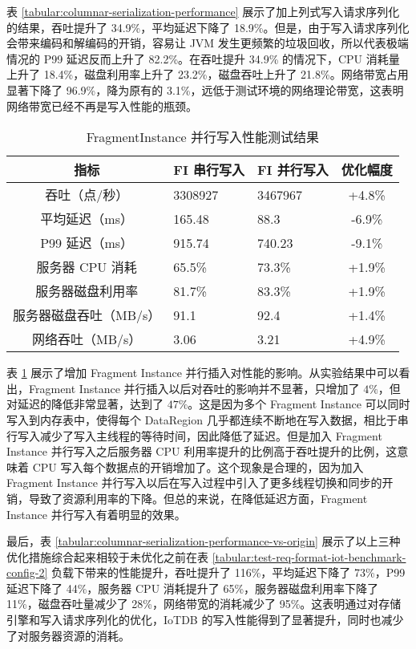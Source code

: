 表 \ref{tabular:columnar-serialization-performance} 展示了加上列式写入请求序列化的结果，吞吐提升了 34.9\%，平均延迟下降了 18.9\%。但是，由于写入请求序列化会带来编码和解编码的开销，容易让 JVM 发生更频繁的垃圾回收，所以代表极端情况的 P99 延迟反而上升了 82.2\%。在吞吐提升 34.9\% 的情况下，CPU 消耗量上升了 18.4\%，磁盘利用率上升了 23.2\%，磁盘吞吐上升了 21.8\%。网络带宽占用显著下降了 96.9\%，降为原有的 3.1\%，远低于测试环境的网络理论带宽，这表明网络带宽已经不再是写入性能的瓶颈。

\begin{table}
  \centering
  \caption{FragmentInstance 并行写入性能测试结果}
  \begin{tabular}{cp{3.5cm}p{3.5cm}c}
    \toprule 
    指标 &    FI 串行写入 &  FI 并行写入 & 优化幅度 \\
    \midrule  
    吞吐（点/秒） & 	3308927 & 3467967 & +4.8\%\\  
    平均延迟（ms） &  	165.48 & 88.3 & -6.9\%\\  
    P99 延迟（ms） & 	915.74 & 740.23 & -9.1\%\\  
    服务器 CPU 消耗 &  	65.5\% & 73.3\% & +1.9\%\\  
    服务器磁盘利用率 & 	81.7\% & 83.3\% & +1.9\%\\  
    服务器磁盘吞吐（MB/s） & 91.1 & 92.4 & +1.4\%\\  
    网络吞吐（MB/s） & 	3.06 & 3.21 & +4.9\%\\  
    \bottomrule
  \end{tabular}
  \label{tabular:fi-parallel-insert-performance}
\end{table}

表 \ref{tabular:fi-parallel-insert-performance} 展示了增加 Fragment Instance 并行插入对性能的影响。从实验结果中可以看出，Fragment Instance 并行插入以后对吞吐的影响并不显著，只增加了 $4\%$，但对延迟的降低非常显著，达到了 $47\%$。这是因为多个 Fragment Instance 可以同时写入到内存表中，使得每个 DataRegion 几乎都连续不断地在写入数据，相比于串行写入减少了写入主线程的等待时间，因此降低了延迟。但是加入 Fragment Instance 并行写入之后服务器 CPU 利用率提升的比例高于吞吐提升的比例，这意味着 CPU 写入每个数据点的开销增加了。这个现象是合理的，因为加入 Fragment Instance 并行写入以后在写入过程中引入了更多线程切换和同步的开销，导致了资源利用率的下降。但总的来说，在降低延迟方面，Fragment Instance 并行写入有着明显的效果。

最后，表 \ref{tabular:columnar-serialization-performance-vs-origin} 展示了以上三种优化措施综合起来相较于未优化之前在表 \ref{tabular:test-req-format-iot-benchmark-config-2} 负载下带来的性能提升，吞吐提升了 116\%，平均延迟下降了 73\%，P99 延迟下降了 44\%，服务器 CPU 消耗提升了 65\%，服务器磁盘利用率下降了 11\%，磁盘吞吐量减少了 28\%，网络带宽的消耗减少了 95\%。这表明通过对存储引擎和写入请求序列化的优化，IoTDB 的写入性能得到了显著提升，同时也减少了对服务器资源的消耗。

